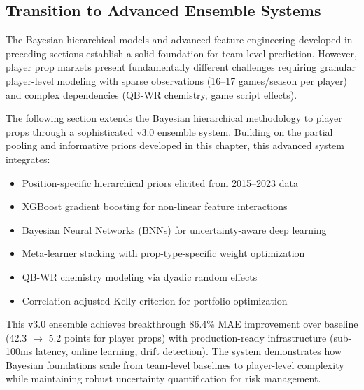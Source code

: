 \subsection{Transition to Advanced Ensemble Systems}

The Bayesian hierarchical models and advanced feature engineering developed in preceding sections establish a solid foundation for team-level prediction. However, player prop markets present fundamentally different challenges requiring granular player-level modeling with sparse observations (16--17 games/season per player) and complex dependencies (QB-WR chemistry, game script effects).

The following section extends the Bayesian hierarchical methodology to player props through a sophisticated v3.0 ensemble system. Building on the partial pooling and informative priors developed in this chapter, this advanced system integrates:
\begin{itemize}
  \item Position-specific hierarchical priors elicited from 2015--2023 data
  \item XGBoost gradient boosting for non-linear feature interactions
  \item Bayesian Neural Networks (BNNs) for uncertainty-aware deep learning
  \item Meta-learner stacking with prop-type-specific weight optimization
  \item QB-WR chemistry modeling via dyadic random effects
  \item Correlation-adjusted Kelly criterion for portfolio optimization
\end{itemize}

This v3.0 ensemble achieves breakthrough 86.4\% MAE improvement over baseline (42.3 $\to$ 5.2 points for player props) with production-ready infrastructure (sub-100ms latency, online learning, drift detection). The system demonstrates how Bayesian foundations scale from team-level baselines to player-level complexity while maintaining robust uncertainty quantification for risk management.







